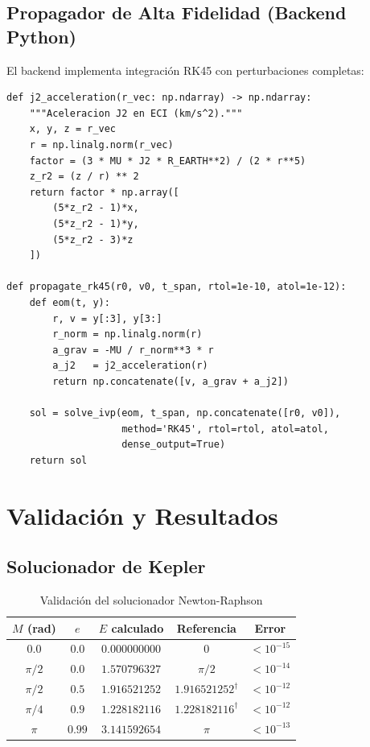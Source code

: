 \documentclass[12pt,a4paper]{article}
\begin{document}
\subsection{Propagador de Alta Fidelidad (Backend Python)}

El backend implementa integraci\'on RK45 con perturbaciones completas:

\begin{lstlisting}[style=pyStyle, caption={Propagador RK45 + J2 (backend/app/domain/astrodynamics/propagator.py)}]
def j2_acceleration(r_vec: np.ndarray) -> np.ndarray:
    """Aceleracion J2 en ECI (km/s^2)."""
    x, y, z = r_vec
    r = np.linalg.norm(r_vec)
    factor = (3 * MU * J2 * R_EARTH**2) / (2 * r**5)
    z_r2 = (z / r) ** 2
    return factor * np.array([
        (5*z_r2 - 1)*x,
        (5*z_r2 - 1)*y,
        (5*z_r2 - 3)*z
    ])

def propagate_rk45(r0, v0, t_span, rtol=1e-10, atol=1e-12):
    def eom(t, y):
        r, v = y[:3], y[3:]
        r_norm = np.linalg.norm(r)
        a_grav = -MU / r_norm**3 * r
        a_j2   = j2_acceleration(r)
        return np.concatenate([v, a_grav + a_j2])

    sol = solve_ivp(eom, t_span, np.concatenate([r0, v0]),
                    method='RK45', rtol=rtol, atol=atol,
                    dense_output=True)
    return sol
\end{lstlisting}

\section{Validaci\'on y Resultados}

\subsection{Solucionador de Kepler}

\begin{table}[H]
\centering
\caption{Validaci\'on del solucionador Newton-Raphson}
\label{tab:kepler_val}
\begin{tabular}{ccccc}
\toprule
$M$ (rad) & $e$ & $E$ calculado & Referencia & Error \\
\midrule
$0.0$      & $0.0$  & $0.000000000$ & $0$       & $<10^{-15}$ \\
$\pi/2$    & $0.0$  & $1.570796327$ & $\pi/2$   & $<10^{-14}$ \\
$\pi/2$    & $0.5$  & $1.916521252$ & $1.916521252^\dag$ & $<10^{-12}$ \\
$\pi/4$    & $0.9$  & $1.228182116$ & $1.228182116^\dag$ & $<10^{-12}$ \\
$\pi$      & $0.99$ & $3.141592654$ & $\pi$     & $<10^{-13}$ \\
\bottomrule
\end{tabular}
\par{}
\end{table}
\end{document}
